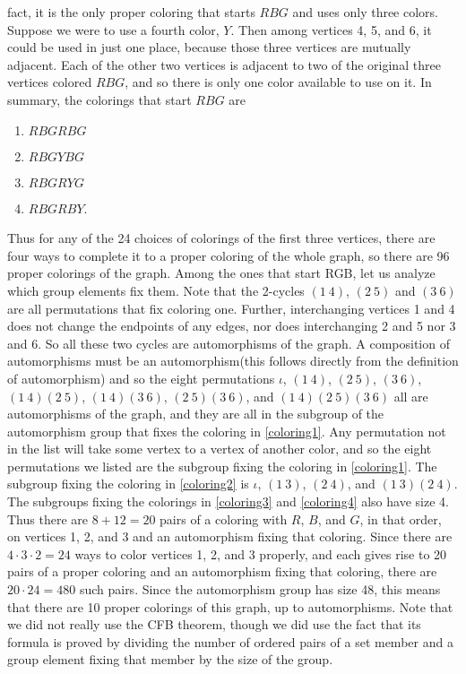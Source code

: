 {fact, it is the only proper coloring that starts $RBG$ and uses only three colors.  Suppose
we were to use a fourth color, $Y$.  Then among vertices 4, 5, and 6, it could be used in
just one place, because those three vertices are mutually adjacent.  Each of the other two
vertices is adjacent to two of the original three vertices colored $RBG$, and so there is
only one color available to use on it.  In summary, the colorings that start $RBG$ are
\begin{enumerate}\item $RBGRBG$\label{coloring1}
\item $RBGYBG$\label{coloring2}
\item $RBGRYG$\label{coloring3}
\item $RBGRBY$.\label{coloring4}
\end{enumerate}
Thus for any of the 24 choices of colorings of the first three vertices, there are four
ways to complete it to a proper coloring of the whole graph, so there are 96 proper
colorings of the graph.  Among the ones that start RGB, let us analyze which group
elements fix them.  Note that the 2-cycles $(1\ 4)$, $(2\ 5)$ and $(3\ 6)$ are all
permutations that fix coloring one. Further, interchanging vertices 1 and 4 does not
change the endpoints of any edges, nor does interchanging 2 and 5 nor 3 and 6.  So all
these two cycles are automorphisms of the graph.  A composition of automorphisms must be an
automorphism(this follows directly from the definition of automorphism) and so the eight
permutations $\iota$, $(1\ 4)$, $(2\ 5)$, $(3\ 6)$, $(1\ 4)(2\ 5)$, $(1\ 4)
(3\ 6)$, $(2\ 5)(3\ 6)$, and $(1\ 4)(2\ 5)(3\ 6)$ all are automorphisms of the graph, and
they are all in the subgroup of the automorphism group that fixes the coloring in
\ref{coloring1}.  Any permutation not in the list will take some vertex to a vertex of
another color, and so the eight permutations we listed are the subgroup fixing the
coloring in \ref{coloring1}.  The subgroup fixing the coloring in \ref{coloring2} is
$\iota$, $(1\ 3)$, $(2\ 4)$, and $(1\ 3)(2\ 4)$. The subgroups fixing the colorings in
\ref{coloring3} and \ref{coloring4} also have size 4.  Thus there are $8+12=20$ pairs of a
coloring with $R$, $B$, and $G$, in that order, on vertices 1, 2, and 3 and an automorphism
fixing that coloring.  Since there are $4\cdot3\cdot2=24$ ways to color vertices 1, 2, and
3 properly, and each gives rise to 20 pairs of a proper coloring and an automorphism fixing
that coloring, there are $20\cdot24=480$ such pairs.  Since the automorphism group has
size 48, this means that there are 10 proper colorings of this graph, up to
automorphisms.  Note that we did not really use the CFB theorem, though we did use the
fact that its formula is proved by dividing the number of ordered pairs of a set member
and a group element fixing that member by the size of the group.}




